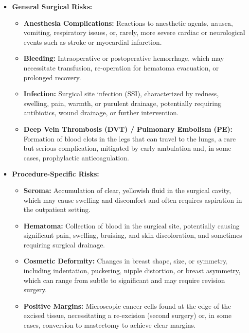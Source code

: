 \begin{itemize}
  \item \textbf{General Surgical Risks:}
    \begin{itemize}
      \item \textbf{Anesthesia Complications:} Reactions to anesthetic agents, nausea, vomiting, respiratory issues, or, rarely, more severe cardiac or neurological events such as stroke or myocardial infarction.
      
      \item \textbf{Bleeding:} Intraoperative or postoperative hemorrhage, which may necessitate transfusion, re-operation for hematoma evacuation, or prolonged recovery.
      
      \item \textbf{Infection:} Surgical site infection (SSI), characterized by redness, swelling, pain, warmth, or purulent drainage, potentially requiring antibiotics, wound drainage, or further intervention.
      
      \item \textbf{Deep Vein Thrombosis (DVT) / Pulmonary Embolism (PE):} Formation of blood clots in the legs that can travel to the lungs, a rare but serious complication, mitigated by early ambulation and, in some cases, prophylactic anticoagulation.
    \end{itemize}
  
  \item \textbf{Procedure-Specific Risks:}
    \begin{itemize}
      \item \textbf{Seroma:} Accumulation of clear, yellowish fluid in the surgical cavity, which may cause swelling and discomfort and often requires aspiration in the outpatient setting.
      
      \item \textbf{Hematoma:} Collection of blood in the surgical site, potentially causing significant pain, swelling, bruising, and skin discoloration, and sometimes requiring surgical drainage.
      
      \item \textbf{Cosmetic Deformity:} Changes in breast shape, size, or symmetry, including indentation, puckering, nipple distortion, or breast asymmetry, which can range from subtle to significant and may require revision surgery.
      
      \item \textbf{Positive Margins:} Microscopic cancer cells found at the edge of the excised tissue, necessitating a re-excision (second surgery) or, in some cases, conversion to mastectomy to achieve clear margins.
      

\end{itemize}
\end{itemize}
